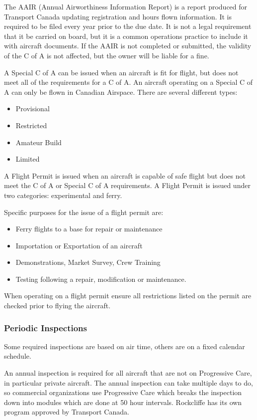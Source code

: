 \documentclass[12pt,letterpaper]{article}
\begin{document}
    The AAIR (Annual Airworthiness Information Report) is a report produced for Transport Canada updating registration and hours flown information. It is required to be filed every year prior to the due date. It is not a legal requirement that it be carried on board, but it is a common operations practice to include it with aircraft documents. If the AAIR is not completed or submitted, the validity of the C of A is not affected, but the owner will be liable for a fine.

    A Special C of A can be issued when an aircraft is fit for flight, but does not meet all of the requirements for a C of A.  An aircraft operating on a Special C of A can only be flown in Canadian Airspace. There are several different types:
    \begin{itemize}
        \item Provisional
        \item Restricted
        \item Amateur Build
        \item Limited
    \end{itemize}

    A Flight Permit is issued when an aircraft is capable of safe flight but does not meet the C of A or Special C of A requirements.  A Flight Permit is issued under two categories: experimental and ferry.
    
    Specific purposes for the issue of a flight permit are:
    \begin{itemize}
        \item Ferry flights to a base for repair or maintenance
        \item Importation or Exportation of an aircraft
        \item Demonstrations, Market Survey, Crew Training
        \item Testing following a repair, modification or maintenance.
    \end{itemize}
    
    When operating on a flight permit ensure all restrictions listed on the permit are checked prior to flying the aircraft.

    \subsubsection{Periodic Inspections}
    Some required inspections are based on air time, others are on a fixed calendar schedule.
    
    An annual inspection is required for all aircraft that are not on Progressive Care, in particular private aircraft. The annual inspection can take multiple days to do, so commercial organizations use Progressive Care which breaks the inspection down into modules which are done at 50 hour intervals. Rockcliffe has its own program approved by Transport Canada.
\end{document}
